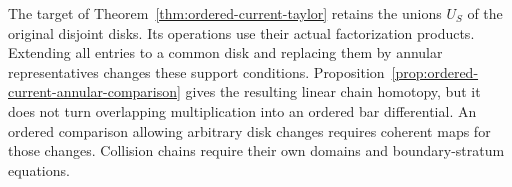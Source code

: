 The target of Theorem~\ref{thm:ordered-current-taylor} retains the
unions $U_S$ of the original disjoint disks.  Its operations use
their actual factorization products.  Extending all entries to a
common disk and replacing them by annular representatives changes
these support conditions.  Proposition~\ref{prop:ordered-current-annular-comparison}
gives the resulting linear chain homotopy, but it does not turn
overlapping multiplication into an ordered bar differential.
An ordered comparison allowing arbitrary disk changes requires
coherent maps for those changes.  Collision chains require their
own domains and boundary-stratum equations.
